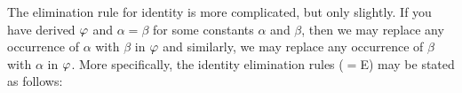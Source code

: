 The elimination rule for identity is more complicated, but only slightly.
%
%
%
%
%
%
If you have derived $\varphi$ and $\alpha = \beta$ for some constants $\alpha$ and $\beta$, then we may replace any occurrence of $\alpha$ with $\beta$ in $\varphi$ and similarly, we may replace any occurrence of $\beta$ with $\alpha$ in $\varphi$.
More specifically, the identity elimination rules ($=$E) may be stated as follows:

